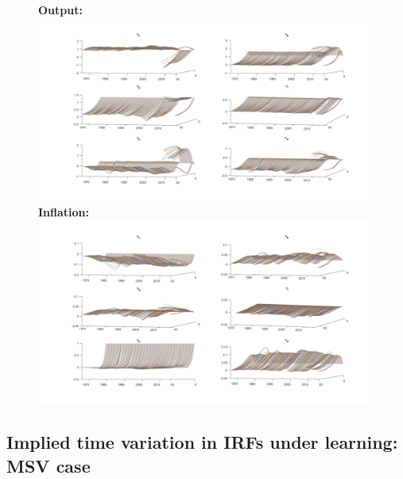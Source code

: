 \documentclass[12pt,reqno]{article}
\numberwithin{equation}{section}
\begin{document}
\begin{figure}[H]
\textbf{Output:}\\
\includegraphics[scale=0.5]{AR1_impresp_output_3d.pdf}
\textbf{Inflation:}\\
\includegraphics[scale=0.5]{AR1_impresp_pinf_3d.pdf}

\end{figure}


\subsection*{Implied time variation in IRFs under learning: MSV case}
\end{document}
